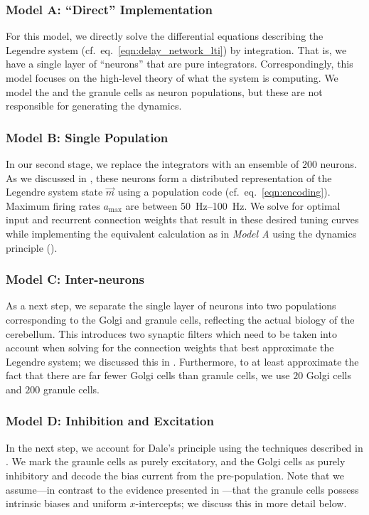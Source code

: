 \subsubsection{Model A: \enquote{Direct} Implementation} 
For this model, we directly solve the differential equations describing the Legendre system (cf.~eq.~\ref{eqn:delay_network_lti}) by integration.
That is, we have a single layer of \enquote{neurons} that are pure integrators.
Correspondingly, this model focuses on the high-level theory of what the system is computing.
We model the \PCN and the granule cells as neuron populations, but these are not responsible for generating the dynamics.

\subsubsection{Model B: Single Population}
In our second stage, we replace the integrators with an ensemble of $200$ \LIF neurons.
As we discussed in , these neurons form a distributed representation of the Legendre system state $\vec{m}$ using a population code (cf.~eq.~\ref{eqn:encoding}).
Maximum firing rates $a_\mathrm{max}$ are between \SIrange{50}{100}{\hertz}.
We solve for optimal input and recurrent connection weights that result in these desired tuning curves while implementing the equivalent calculation as in \emph{Model A} using the \NEF dynamics principle ().

\subsubsection{Model C: Inter-neurons}
As a next step, we separate the single layer of neurons into two populations corresponding to the Golgi and granule cells, reflecting the actual biology of the cerebellum.
This introduces two synaptic filters which need to be taken into account when solving for the connection weights that best approximate the Legendre system; we discussed this in .
Furthermore, to at least approximate the fact that there are far fewer Golgi cells than granule cells, we use $20$ Golgi cells and $200$ granule cells.

\subsubsection{Model D: Inhibition and Excitation}
In the next step, we account for Dale's principle using the techniques described in .
We mark the graunle cells as purely excitatory, and the Golgi cells as purely inhibitory and decode the bias current from the pre-population.
Note that we assume---in contrast to the evidence presented in ---that the granule cells possess intrinsic biases and uniform $x$-intercepts; we discuss this in more detail below.


